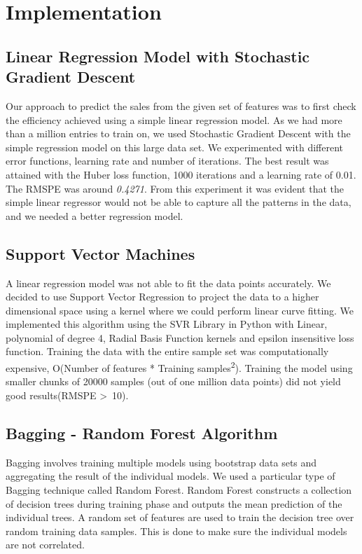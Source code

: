 \documentclass[12pt,a4paper]{article}
\begin{document}
\section{Implementation}
\subsection{Linear Regression Model with Stochastic Gradient Descent}
\label{sgd}
Our approach to predict the sales from the given set of features was to first check the efficiency achieved using a simple linear regression model. As we had more than a million entries to train on, we used Stochastic Gradient Descent\cite{sgdlib} with the simple regression model on this large data set. We experimented with different error functions, learning rate and number of iterations. The best result was attained with the Huber loss function\cite{wiki_hu}, 1000 iterations and a learning rate of 0.01. The RMSPE was around \textit{0.4271}. From this experiment it was evident that the simple linear regressor would not be able to capture all the patterns in the data, and we needed a better regression model.

\subsection{Support Vector Machines}
\label{svm}
A linear regression model was not able to fit the data points accurately. We decided to use Support Vector Regression to project the data to a higher dimensional space using a kernel where we could perform linear curve fitting. We implemented this algorithm using the SVR Library\cite{svrlib} in Python with Linear, polynomial of degree 4, Radial Basis Function kernels\cite{kernel} and epsilon insensitive loss function\cite{bishop}. Training the data with the entire sample set was computationally expensive, O(Number of features * Training samples\textsuperscript{2})\cite{svmruntime}. Training the model using smaller chunks of 20000 samples (out of one million data points) did not yield good results(RMSPE \textgreater  \ 10).

\subsection{Bagging - Random Forest Algorithm}
\label{rf}
Bagging involves training multiple models using bootstrap data sets and aggregating the result of the individual models\cite{bishop}. We used a particular type of Bagging technique called Random Forest. Random Forest\cite{wiki_rf} constructs a collection of decision trees\cite{wiki_dt} during training phase and outputs the mean prediction of the individual trees. A random set of features are used to train the decision tree over random training data samples. This is done to make sure the individual models are not correlated.
\end{document}
